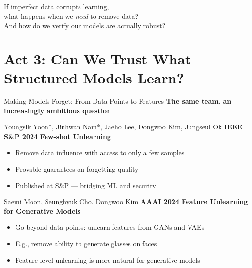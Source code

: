 \documentclass[aspectratio=169,11pt]{beamer}
\newcommand{\papercite}[1]{{\scriptsize\color{mutedText}#1}}
\newcommand{\venue}[1]{{\small\textcolor{postechBlue}{\textbf{#1}}}}
\begin{document}
\begin{frame}[plain]
  \vspace{2cm}
  \begin{center}
    {\Large\textcolor{postechBlue}{If imperfect data corrupts learning,}}\\[8pt]
    {\Large\textcolor{postechBlue}{what happens when we \textit{need} to remove data?}}\\[16pt]
    {\large\textcolor{mutedText}{And how do we verify our models are actually robust?}}
  \end{center}
\end{frame}

\section{Act 3: Can We Trust What Structured Models Learn?}

\begin{frame}{Making Models Forget: From Data Points to Features}
  \textbf{The same team, an increasingly ambitious question}
  \vspace{8pt}

  \papercite{Youngsik Yoon*, Jinhwan Nam*, Jaeho Lee, Dongwoo Kim, Jungseul Ok \hfill \venue{IEEE S\&P 2024}}
  \vspace{2pt}
  \textbf{Few-shot Unlearning}
  \begin{itemize}
    \item Remove data influence with access to only a \alert{few samples}
    \item Provable guarantees on forgetting quality
    \item Published at S\&P --- bridging ML and security
  \end{itemize}

  \vspace{8pt}

  \papercite{Saemi Moon, Seunghyuk Cho, Dongwoo Kim \hfill \venue{AAAI 2024}}
  \vspace{2pt}
  \textbf{Feature Unlearning for Generative Models}
  \begin{itemize}
    \item Go beyond data points: unlearn \alert{features} from GANs and VAEs
    \item E.g., remove ability to generate glasses on faces
    \item Feature-level unlearning is more natural for generative models
  \end{itemize}
\end{frame}
\end{document}
